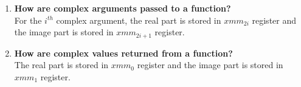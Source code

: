 \documentclass{article}
\begin{document}
\begin{enumerate}[label=\textbf{\Alph*.}]
	\item \textbf{How are complex arguments passed to a function?} \\
	For the $i^{th}$ complex argument, the real part is stored in $xmm_{2i}$ register
	and the image part is stored in $xmm_{2i+1}$ register.
	\item \textbf{How are complex values returned from a function?} \\
	The real part is stored in $xmm_0$ register and the image part is stored in $xmm_1$ register.
\end{enumerate}
\end{document}
